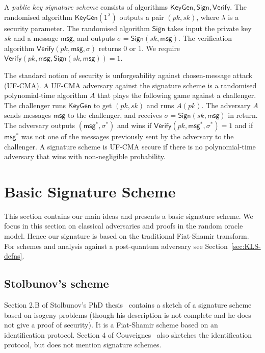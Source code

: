 \documentclass{llncs}
\newcommand{\msg}{\mathsf{msg}}
\newcommand{\KeyGen}{\mathsf{KeyGen}}
\newcommand{\Sign}{\mathsf{Sign}}
\newcommand{\Verify}{\mathsf{Verify}}
\begin{document}
A \emph{public key signature scheme} consists of algorithms $\KeyGen, \Sign, \Verify$.
The randomised algorithm $\KeyGen( 1^\lambda )$ outputs a pair $(pk,sk)$, where $\lambda$ is a security parameter.
The randomised algorithm $\Sign$ takes input the private key $sk$ and a message $\msg$, and  outputs $\sigma = \Sign( sk, \msg )$.
The verification algorithm $\Verify( pk, \msg, \sigma )$ returns $0$ or $1$.
We require $\Verify( pk, \msg, \Sign( sk, \msg )) = 1$.


The standard notion of security is unforgeability against chosen-message attack (UF-CMA).
A UF-CMA adversary against the signature scheme is a randomised polynomial-time algorithm $A$ that plays the following game against a challenger.
The challenger runs $\KeyGen$ to get $(pk,sk)$ and runs $A( pk )$.
The adversary $A$ sends messages $\msg$ to the challenger, and receives $\sigma = \Sign(sk, \msg)$ in return.
The adversary outputs $(\msg^*, \sigma^*)$ and wins if $\Verify( pk, \msg^*, \sigma^* ) = 1$ and if $\msg^*$ was not one of the messages previously sent by the adversary to the challenger.
A signature scheme is UF-CMA secure if there is no polynomial-time adversary that wins with non-negligible probability.






\section{Basic Signature Scheme}\label{sec:basic-scheme}

This section contains our main ideas and presents a basic signature scheme.
We focus in this section on classical adversaries and proofs in the random oracle model.
Hence our signature is based on the traditional Fiat-Shamir transform.
For schemes and analysis against a post-quantum adversary see Section~\ref{sec:KLS-defns}.

\subsection{Stolbunov's scheme}

Section 2.B of Stolbunov's PhD thesis~\cite{Sto12} contains a sketch of a signature scheme based on isogeny problems (though his description is not complete and he does not give a proof of security).
It is a Fiat-Shamir scheme based on an identification protocol.
Section 4 of Couveignes~\cite{Couv06} also sketches the identification protocol, but does not mention signature schemes.
\end{document}
